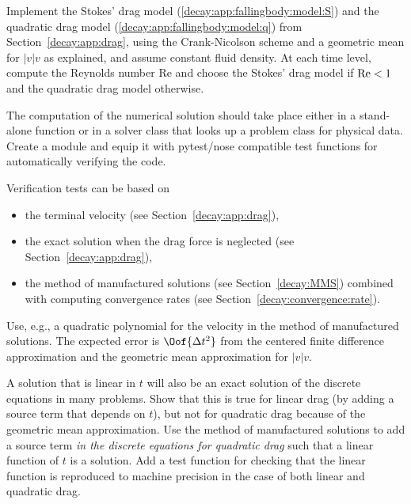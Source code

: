 \documentclass[graybox,sectrefs,envcountresetchap,open=right,final]{svmonodo}
\makeatletter
\newenvironment{doconceexercise}{}{}
\newcounter{doconceexercisecounter}%
\newcommand\listofexercises{
\chapter*{List of Exercises, Problems, and Projects
          \@mkboth{List of Exercises, Problems, and Projects}{List of Exercises, Problems, and Projects}}
\markboth{List of Exercises, Problems, and Projects}{List of Exercises, Problems, and Projects}
\@starttoc{loe}
}
\makeatother
\begin{document}
\begin{doconceexercise}

                
\label{decay:app:exer:drag:prog}

Implement the Stokes' drag model (\ref{decay:app:fallingbody:model:S})
and the quadratic drag model (\ref{decay:app:fallingbody:model:q}) from
Section~\ref{decay:app:drag}, using the Crank-Nicolson
scheme and a geometric mean for $|v|v$ as explained, and assume
constant fluid density.
At each time level, compute the Reynolds number
Re and choose the Stokes' drag model if $\hbox{Re} < 1$ and the
quadratic drag model otherwise.

The computation of the numerical solution should take place either in
a stand-alone function or in a solver class that looks up a problem
class for physical data. Create a module and equip it with pytest/nose
compatible test functions for automatically verifying the code.

Verification tests can be based on

\begin{itemize}
 \item the terminal velocity (see Section~\ref{decay:app:drag}),

 \item the exact solution when the drag force is neglected (see Section~\ref{decay:app:drag}),

 \item the method of manufactured solutions (see Section~\ref{decay:MMS}) combined with computing convergence rates (see Section~\ref{decay:convergence:rate}).
\end{itemize}

\noindent
Use, e.g., a quadratic polynomial for the velocity in the method of
manufactured solutions. The expected error is $\Oof{\Delta t^2}$
from the centered finite difference approximation and the geometric
mean approximation for $|v|v$.

A solution that is linear in $t$ will also be an exact solution of the
discrete equations in many problems.  Show that this is true for
linear drag (by adding a source term that depends on $t$), but not
for quadratic drag because of the geometric mean approximation.  Use
the method of manufactured solutions to add a source term \emph{in the
discrete equations for quadratic drag} such that a linear function of
$t$ is a solution. Add a test function for checking that the linear
function is reproduced to machine precision in the case of both linear
and quadratic drag.


\end{doconceexercise}
\end{document}
